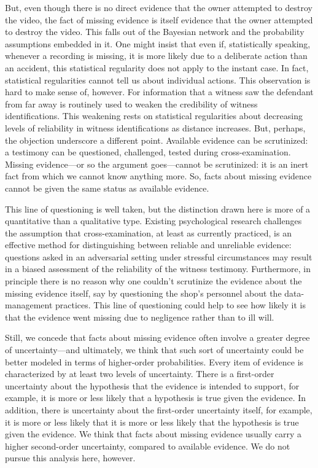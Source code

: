 \documentclass[
  10pt,
  dvipsnames,enabledeprecatedfontcommands]{scrartcl}
\begin{document}
But, even though there is no direct evidence that the owner attempted to
destroy the video, the fact of missing evidence is itself evidence that
the owner attempted to destroy the video. This falls out of the Bayesian
network and the probability assumptions embedded in it. One might insist
that even if, statistically speaking, whenever a recording is missing,
it is more likely due to a deliberate action than an accident, this
statistical regularity does not apply to the instant case. In fact,
statistical regularities cannot tell us about individual actions. This
observation is hard to make sense of, however. For information that a
witness saw the defendant from far away is routinely used to weaken the
credibility of witness identifications. This weakening rests on
statistical regularities about decreasing levels of reliability in
witness identifications as distance increases. But, perhaps, the
objection underscore a different point. Available evidence can be
scrutinized: a testimony can be questioned, challenged, tested during
cross-examination. Missing evidence---or so the argument goes---cannot
be scrutinized: it is an inert fact from which we cannot know anything
more. So, facts about missing evidence cannot be given the same status
as available evidence.

This line of questioning is well taken, but the distinction drawn here
is more of a quantitative than a qualitative type. Existing
psychological research challenges the assumption that cross-examination,
at least as currently practiced, is an effective method for
distinguishing between reliable and unreliable evidence: questions asked
in an adversarial setting under stressful circumstances may result in a
biased assessment of the reliability of the witness testimony.
Furthermore, in principle there is no reason why one couldn't scrutinize
the evidence about the missing evidence itself, say by questioning the
shop's personnel about the data-management practices. This line of
questioning could help to see how likely it is that the evidence went
missing due to negligence rather than to ill will.

Still, we concede that facts about missing evidence often involve a
greater degree of uncertainty---and ultimately, we think that such sort
of uncertainty could be better modeled in terms of higher-order
probabilities. Every item of evidence is characterized by at least two
levels of uncertainty. There is a first-order uncertainty about the
hypothesis that the evidence is intended to support, for example, it is
more or less likely that a hypothesis is true given the evidence. In
addition, there is uncertainty about the first-order uncertainty itself,
for example, it is more or less likely that it is more or less likely
that the hypothesis is true given the evidence. We think that facts
about missing evidence usually carry a higher second-order uncertainty,
compared to available evidence. We do not pursue this analysis here,
however.
\end{document}
